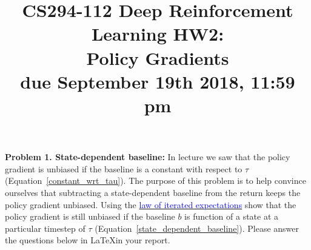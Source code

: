 \documentclass[12pt]{article}
\title{CS294-112 Deep Reinforcement Learning HW2: \\ Policy Gradients\\
\textbf{due September 19th 2018, 11:59 pm}}
\author{
}
\date{}
\begin{document}
\maketitle


\textbf{Problem 1. State-dependent baseline:}
In lecture we saw that the policy gradient is unbiased if the baseline is a constant with respect to $\tau$ (Equation~\ref{constant_wrt_tau}). The purpose of this problem is to help convince ourselves that subtracting a state-dependent baseline from the return keeps the policy gradient unbiased. Using the \href{https://en.wikipedia.org/wiki/Law_of_total_expectation}{\textcolor{blue}{law of iterated expectations}} show that the policy gradient is still unbiased if the baseline $b$ is function of a state at a particular timestep of $\tau$ (Equation~\ref{state_dependent_baseline}).
Please answer the questions below in \LaTeX in your report.
\end{document}
